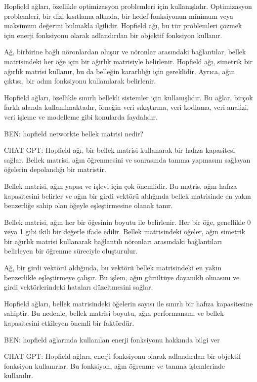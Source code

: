 \documentclass[11pt]{article}
\begin{document}
Hopfield ağları, özellikle optimizasyon problemleri için kullanışlıdır. Optimizasyon problemleri, bir dizi kısıtlama altında, bir hedef fonksiyonun minimum veya maksimum değerini bulmakla ilgilidir. Hopfield ağı, bu tür problemleri çözmek için enerji fonksiyonu olarak adlandırılan bir objektif fonksiyon kullanır.

Ağ, birbirine bağlı nöronlardan oluşur ve nöronlar arasındaki bağlantılar, bellek matrisindeki her öğe için bir ağırlık matrisiyle belirlenir. Hopfield ağı, simetrik bir ağırlık matrisi kullanır, bu da belleğin kararlılığı için gereklidir. Ayrıca, ağın çıktısı, bir adım fonksiyonu kullanılarak belirlenir.

Hopfield ağları, özellikle sınırlı bellekli sistemler için kullanışlıdır. Bu ağlar, birçok farklı alanda kullanılmaktadır, örneğin veri sıkıştırma, veri kodlama, veri analizi, veri işleme ve modelleme gibi konularda faydalıdır.

BEN: hopfield networkte bellek matrisi nedir?

CHAT GPT: Hopfield ağı, bir bellek matrisi kullanarak bir hafıza kapasitesi sağlar. Bellek matrisi, ağın öğrenmesini ve sonrasında tanıma yapmasını sağlayan öğelerin depolandığı bir matristir.

Bellek matrisi, ağın yapısı ve işlevi için çok önemlidir. Bu matris, ağın hafıza kapasitesini belirler ve ağın bir girdi vektörü aldığında bellek matrisinde en yakın benzerliğe sahip olan öğeyle eşleştirmesine olanak tanır.

Bellek matrisi, ağın her bir öğesinin boyutu ile belirlenir. Her bir öğe, genellikle 0 veya 1 gibi ikili bir değerle ifade edilir. Bellek matrisindeki öğeler, ağın simetrik bir ağırlık matrisi kullanarak bağlantılı nöronları arasındaki bağlantıları belirleyen bir öğrenme süreciyle oluşturulur.

Ağ, bir girdi vektörü aldığında, bu vektörü bellek matrisindeki en yakın benzerlikle eşleştirmeye çalışır. Bu işlem, ağın gürültüye dayanıklı olmasını ve girdi vektörlerindeki hataları düzeltmesini sağlar.

Hopfield ağları, bellek matrisindeki öğelerin sayısı ile sınırlı bir hafıza kapasitesine sahiptir. Bu nedenle, bellek matrisi boyutu, ağın performansını ve bellek kapasitesini etkileyen önemli bir faktördür.

BEN: hopfield ağlarında kullanılan enerji fonksiyonu hakkında bilgi ver

CHAT GPT: Hopfield ağları, enerji fonksiyonu olarak adlandırılan bir objektif fonksiyon kullanırlar. Bu fonksiyon, ağın öğrenme ve tanıma işlemlerinde kullanılır.
\end{document}
